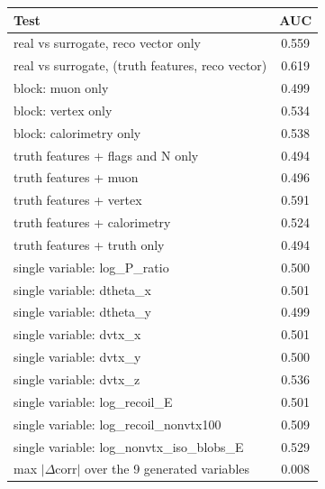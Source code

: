 \begin{tabular}{lc}
\toprule
Test & AUC \\
\midrule
real vs surrogate, reco vector only & 0.559 \\
real vs surrogate, (truth features, reco vector) & 0.619 \\
\midrule
block: muon only & 0.499 \\
block: vertex only & 0.534 \\
block: calorimetry only & 0.538 \\
truth features + flags and N only & 0.494 \\
truth features + muon & 0.496 \\
truth features + vertex & 0.591 \\
truth features + calorimetry & 0.524 \\
truth features + truth only & 0.494 \\
single variable: log\_P\_ratio & 0.500 \\
single variable: dtheta\_x & 0.501 \\
single variable: dtheta\_y & 0.499 \\
single variable: dvtx\_x & 0.501 \\
single variable: dvtx\_y & 0.500 \\
single variable: dvtx\_z & 0.536 \\
single variable: log\_recoil\_E & 0.501 \\
single variable: log\_recoil\_nonvtx100 & 0.509 \\
single variable: log\_nonvtx\_iso\_blobs\_E & 0.529 \\
\midrule
max $|\Delta$corr$|$ over the 9 generated variables & 0.008 \\
\bottomrule
\end{tabular}
